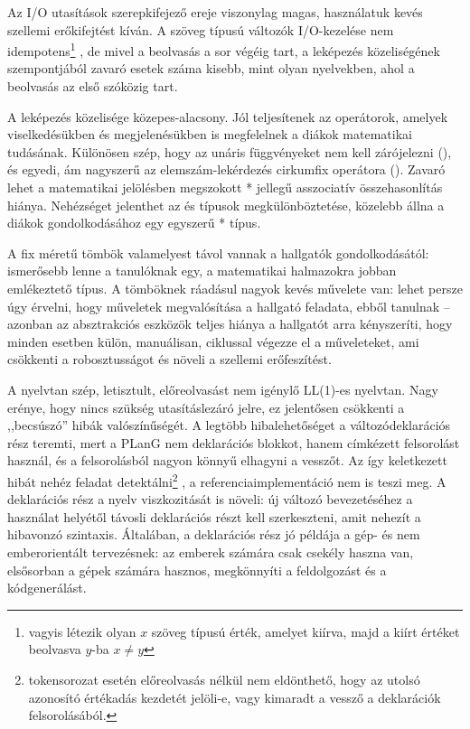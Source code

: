Az I/O utasítások szerepkifejező ereje viszonylag magas, használatuk kevés szellemi erőkifejtést kíván.
A szöveg típusú változók I/O-kezelése nem idempotens\footnote{%
vagyis létezik olyan $x$ szöveg típusú érték, amelyet kiírva, majd a kiírt értéket beolvasva $y$-ba $x \not= y$}%
, de mivel a beolvasás a sor végéig tart, a leképezés közeliségének szempontjából zavaró esetek száma kisebb, mint olyan nyelvekben, ahol a beolvasás az első szóközig tart. %

A leképezés közelisége közepes-alacsony.
Jól teljesítenek az operátorok, amelyek viselkedésükben és megjelenésükben is megfelelnek a diákok matematikai tudásának.
Különösen szép, hogy az unáris függvényeket nem kell zárójelezni (), és egyedi, ám nagyszerű az elemszám-lekérdezés cirkumfix operátora (). Zavaró lehet a matematikai jelölésben megszokott * jellegű asszociatív összehasonlítás hiánya.
Nehézséget jelenthet az  és  típusok megkülönböztetése, közelebb állna a diákok gondolkodásához egy egyszerű * típus.

A fix méretű tömbök valamelyest távol vannak a hallgatók gondolkodásától: ismerősebb lenne a tanulóknak egy, a matematikai halmazokra jobban emlékeztető típus.
A tömböknek ráadásul nagyok kevés művelete van: lehet persze úgy érvelni, hogy műveletek megvalósítása a hallgató feladata, ebből tanulnak -- azonban az absztrakciós eszközök teljes hiánya a hallgatót arra kényszeríti, hogy minden esetben külön, manuálisan, ciklussal végezze el a műveleteket, ami csökkenti a robosztusságot és növeli a szellemi erőfeszítést.

A nyelvtan szép, letisztult, előreolvasást nem igénylő LL(1)-es nyelvtan. Nagy erénye, hogy nincs szükség utasításlezáró jelre, ez jelentősen csökkenti a ,,becsúszó'' hibák\cite[ld.][4.2.2 rész]{McIver01} valószínűségét.
A legtöbb hibalehetőséget a változódeklarációs rész teremti, mert a PLanG nem deklarációs blokkot, hanem címkézett felsorolást használ, és a felsorolásból nagyon könnyű elhagyni a vesszőt.
Az így keletkezett hibát nehéz feladat detektálni\footnote{
	 tokensorozat esetén előreolvasás nélkül nem eldönthető, hogy az utolsó azonosító értékadás kezdetét jelöli-e, vagy  kimaradt a vessző a deklarációk felsorolásából.
}%
, a referenciaimplementáció nem is teszi meg.
A deklarációs rész a nyelv viszkozitását is növeli: új változó bevezetéséhez a használat helyétől távosli deklarációs részt kell szerkeszteni, amit nehezít a hibavonzó szintaxis.
Általában, a deklarációs rész jó példája a gép- és nem emberorientált tervezésnek: az emberek számára csak csekély haszna van, elsősorban a gépek számára hasznos, megkönnyíti a feldolgozást és a kódgenerálást.


